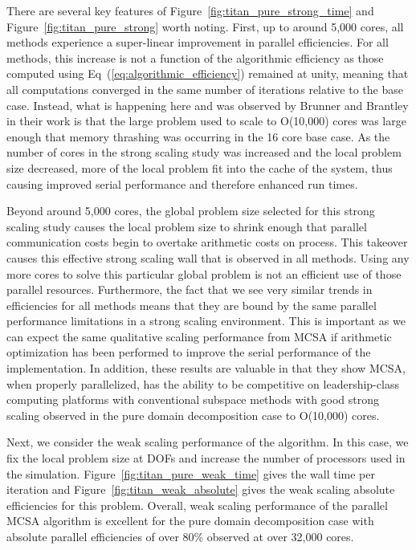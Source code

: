 \documentclass{snamc2013}
\begin{document}
There are several key features of
Figure~\ref{fig:titan_pure_strong_time} and
Figure~\ref{fig:titan_pure_strong} worth noting. First, up to around
5,000 cores, all methods experience a super-linear improvement in
parallel efficiencies. For all methods, this increase is not a
function of the algorithmic efficiency as those computed using
Eq~(\ref{eq:algorithmic_efficiency}) remained at unity, meaning that
all computations converged in the same number of iterations relative
to the base case. Instead, what is happening here and was observed by
Brunner and Brantley in their work is that the large problem used to
scale to O(10,000) cores was large enough that memory thrashing was
occurring in the 16 core base case. As the number of cores in the
strong scaling study was increased and the local problem size
decreased, more of the local problem fit into the cache of the system,
thus causing improved serial performance and therefore enhanced run
times.

Beyond around 5,000 cores, the global problem size selected for this
strong scaling study causes the local problem size to shrink enough
that parallel communication costs begin to overtake arithmetic costs
on process. This takeover causes this effective strong scaling wall
that is observed in all methods. Using any more cores to solve this
particular global problem is not an efficient use of those parallel
resources. Furthermore, the fact that we see very similar trends in
efficiencies for all methods means that they are bound by the same
parallel performance limitations in a strong scaling environment. This
is important as we can expect the same qualitative scaling performance
from MCSA if arithmetic optimization has been performed to improve the
serial performance of the implementation. In addition, these results
are valuable in that they show MCSA, when properly parallelized, has
the ability to be competitive on leadership-class computing platforms
with conventional subspace methods with good strong scaling observed
in the pure domain decomposition case to O(10,000) cores.

Next, we consider the weak scaling performance of the algorithm. In
this case, we fix the local problem size at  DOFs and
increase the number of processors used in the
simulation. Figure~\ref{fig:titan_pure_weak_time} gives the wall time
per iteration and Figure~\ref{fig:titan_weak_absolute} gives the weak
scaling absolute efficiencies for this problem. Overall, weak scaling
performance of the parallel MCSA algorithm is excellent for the pure
domain decomposition case with absolute parallel efficiencies of over
80\% observed at over 32,000 cores.
\end{document}
